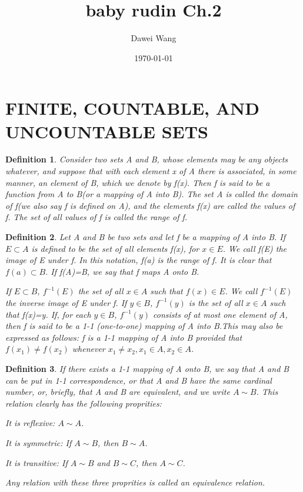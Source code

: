\documentclass{article}
\title{baby rudin Ch.2}
\author{Dawei Wang}
\date{\today}
\newtheorem{defi}{Definition}
\begin{document}
	\maketitle
\section{FINITE, COUNTABLE, AND UNCOUNTABLE SETS}
\begin{defi}
	Consider two sets A and B, whose elements may be any objects whatever, and suppose that with each element x of A there is associated, in some manner, an element of B, which we denote by f(x). Then f is said to be a function from A to B(or a mapping of A into B). The set A is called the domain of f(we also say f is defined on A), and the elements f(x) are called the values of f. The set of all values of f is called the range of f.
\end{defi}

\begin{defi}
	Let A and B be two sets and let f be a mapping of A into B. If $ E\subset A $ is defined to be the set of all elements f(x), for $ x\in E $. We call f(E) the image of E under f. In this notation, f(a) is the range of f. It is clear that $ f(a)\subset B $. If f(A)=B, we say that f maps A onto B.
	
	If $ E\subset B $, $ f^{-1}(E) $ the set of all $ x\in A $ such that $ f(x)\in E $. We call $ f^{-1}(E) $ the inverse image of E under f. If $ y\in B $, $ f^{-1}(y) $ is the set of all $ x\in A $ such that f(x)=y. If, for each $ y\in B $, $ f^{-1}(y) $ consists of at most one element of A, then f is said to be a 1-1 (one-to-one) mapping of A into B.This may also be expressed as follows: f is a 1-1 mapping of A into B provided that $ f(x_1)\neq f(x_2) $ whenever $ x_1\neq x_2, x_1\in A, x_2\in A $.
\end{defi}

\begin{defi}
	If there exists a 1-1 mapping of A onto B, we say that A and B can be put in 1-1 correspondence, or that A and B have the same cardinal number, or, briefly, that A and B are equivalent, and we write $ A\sim B $. This relation clearly has the following proprities:
	
	It is reflexive: $ A\sim A $.
	
	It is symmetric: If $ A\sim B $, then $ B\sim A $.
	
	It is transitive: If $ A\sim B $ and $ B\sim C $, then $ A\sim C $.
	
	Any relation with these three proprities is called an equivalence relation.
\end{defi}
\end{document}

